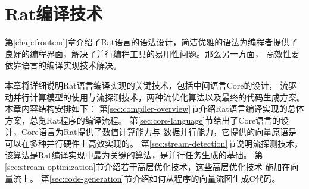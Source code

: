\chapter{Rat编译技术}\label{chap:compiler}
第\ref{chap:frontend}章介绍了Rat语言的语法设计，简洁优雅的语法为编程者提供了
良好的编程界面，解决了并行编程工具的易用性问题。那么另一方面，
高效性要依靠语言的编译实现技术解决。

本章将详细说明Rat语言编译实现的关键技术，包括中间语言Core的设计，
流驱动并行计算模型的使用与流探测技术，两种流优化算法以及最终的代码生成方案。
本章内容结构安排如下：
第\ref{sec:compiler-overview}节介绍Rat语言编译实现的总体方案，总览Rat程序的编译流程。
第\ref{sec:core-language}节给出了Core语言的设计，Core语言为Rat提供了数值计算能力与
数据并行能力，它提供的向量原语是可以在多种并行硬件上高效实现的。
第\ref{sec:stream-detection}节说明流探测技术，该算法是Rat编译实现中最为关键的算法，是并行任务生成的基础。
第\ref{sec:stream-optimization}节介绍若干高层优化技术，这些高层优化技术
施加在向量流上。
第\ref{sec:code-generation}节介绍如何从程序的向量流图生成C代码。

